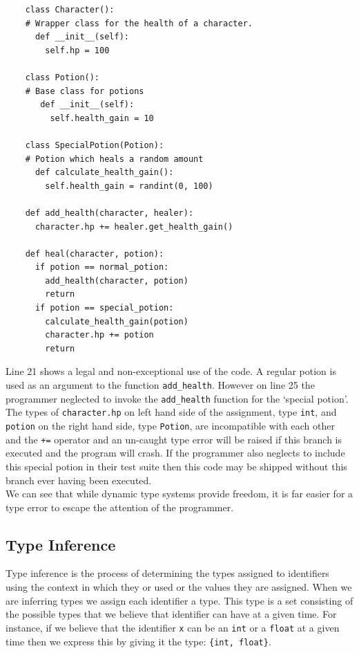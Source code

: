 \documentclass[12pt, titlepage]{article}
\begin{document}
\begin{lstlisting}
    class Character():
    # Wrapper class for the health of a character.
      def __init__(self):
        self.hp = 100
        
    class Potion():
    # Base class for potions
       def __init__(self):
         self.health_gain = 10
    
    class SpecialPotion(Potion):
    # Potion which heals a random amount
      def calculate_health_gain():
        self.health_gain = randint(0, 100)

    def add_health(character, healer):
      character.hp += healer.get_health_gain()

    def heal(character, potion):
      if potion == normal_potion:
        add_health(character, potion)
        return
      if potion == special_potion:
        calculate_health_gain(potion)
        character.hp += potion		
        return
\end{lstlisting}
Line 21 shows a legal and non-exceptional use of the code. A regular potion is used as an argument to the function \texttt{add\_health}. However on line 25 the programmer neglected to invoke the \texttt{add\_health} function for the `special potion'. The types of \texttt{character.hp} on left hand side of the assignment, type \texttt{int}, and \texttt{potion} on the right hand side, type \texttt{Potion}, are incompatible with each other and the \texttt{+=} operator and an un-caught type error will be raised if this branch is executed and the program will crash. If the programmer also neglects to include this special potion in their test suite then this code may be shipped without this branch ever having been executed. \\
\indent We can see that while dynamic type systems provide freedom, it is far easier for a type error to escape the attention of the programmer.

\subsection{Type Inference}
Type inference is the process of determining the types assigned to identifiers using the context in which they or used or the values they are assigned. When we are inferring types we assign each identifier a type. This type is a set consisting of the possible types that we believe that identifier can have at a given time. For instance, if we believe that the identifier \texttt{x} can be an \texttt{int} or a \texttt{float} at a given time then we express this by giving it the type: \texttt{\{int, float\}}.
\end{document}
